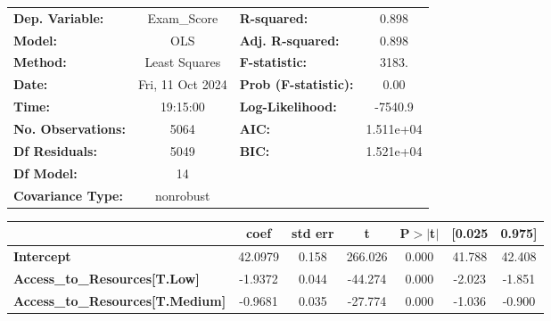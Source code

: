 \documentclass[11pt]{article}
\newcommand{\prompt}[4]{
        {\ttfamily\llap{{\color{#2}[#3]:\hspace{3pt}#4}}\vspace{-\baselineskip}}
    }
\begin{document}
            
\prompt{Out}{outcolor}{130}{}
    
    \begin{center}
\begin{tabular}{lclc}
\toprule
\textbf{Dep. Variable:}                             &   Exam\_Score    & \textbf{  R-squared:         } &     0.898   \\
\textbf{Model:}                                     &       OLS        & \textbf{  Adj. R-squared:    } &     0.898   \\
\textbf{Method:}                                    &  Least Squares   & \textbf{  F-statistic:       } &     3183.   \\
\textbf{Date:}                                      & Fri, 11 Oct 2024 & \textbf{  Prob (F-statistic):} &     0.00    \\
\textbf{Time:}                                      &     19:15:00     & \textbf{  Log-Likelihood:    } &   -7540.9   \\
\textbf{No. Observations:}                          &        5064      & \textbf{  AIC:               } & 1.511e+04   \\
\textbf{Df Residuals:}                              &        5049      & \textbf{  BIC:               } & 1.521e+04   \\
\textbf{Df Model:}                                  &          14      & \textbf{                     } &             \\
\textbf{Covariance Type:}                           &    nonrobust     & \textbf{                     } &             \\
\bottomrule
\end{tabular}
\begin{tabular}{lcccccc}
                                                    & \textbf{coef} & \textbf{std err} & \textbf{t} & \textbf{P$> |$t$|$} & \textbf{[0.025} & \textbf{0.975]}  \\
\midrule
\textbf{Intercept}                                  &      42.0979  &        0.158     &   266.026  &         0.000        &       41.788    &       42.408     \\
\textbf{Access\_to\_Resources[T.Low]}               &      -1.9372  &        0.044     &   -44.274  &         0.000        &       -2.023    &       -1.851     \\
\textbf{Access\_to\_Resources[T.Medium]}            &      -0.9681  &        0.035     &   -27.774  &         0.000        &       -1.036    &       -0.900     \\

\end{tabular}
\end{center}
\end{document}
